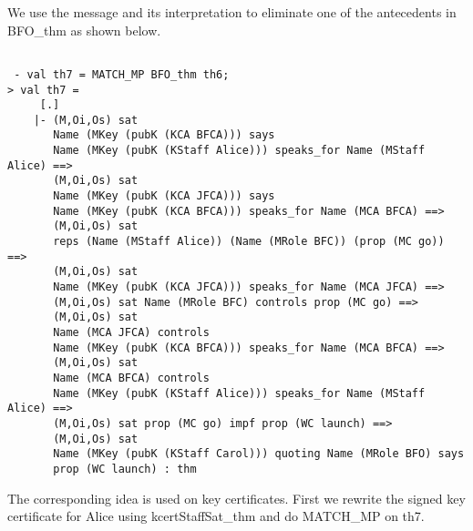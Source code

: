 \documentclass[10pt,twoside]{article}
\begin{document}
We use the message and its interpretation to eliminate one of the
antecedents in BFO\_thm as shown below.
\begin{session}
  \begin{scriptsize}
\begin{verbatim}

 - val th7 = MATCH_MP BFO_thm th6;
> val th7 =
     [.]
    |- (M,Oi,Os) sat
       Name (MKey (pubK (KCA BFCA))) says
       Name (MKey (pubK (KStaff Alice))) speaks_for Name (MStaff Alice) ==>
       (M,Oi,Os) sat
       Name (MKey (pubK (KCA JFCA))) says
       Name (MKey (pubK (KCA BFCA))) speaks_for Name (MCA BFCA) ==>
       (M,Oi,Os) sat
       reps (Name (MStaff Alice)) (Name (MRole BFC)) (prop (MC go)) ==>
       (M,Oi,Os) sat
       Name (MKey (pubK (KCA JFCA))) speaks_for Name (MCA JFCA) ==>
       (M,Oi,Os) sat Name (MRole BFC) controls prop (MC go) ==>
       (M,Oi,Os) sat
       Name (MCA JFCA) controls
       Name (MKey (pubK (KCA BFCA))) speaks_for Name (MCA BFCA) ==>
       (M,Oi,Os) sat
       Name (MCA BFCA) controls
       Name (MKey (pubK (KStaff Alice))) speaks_for Name (MStaff Alice) ==>
       (M,Oi,Os) sat prop (MC go) impf prop (WC launch) ==>
       (M,Oi,Os) sat
       Name (MKey (pubK (KStaff Carol))) quoting Name (MRole BFO) says
       prop (WC launch) : thm
\end{verbatim}
  \end{scriptsize}
\end{session}

The corresponding idea is used on key certificates. First we rewrite
the signed key certificate for Alice using kcertStaffSat\_thm and do
MATCH\_MP on th7.  
\end{document}
